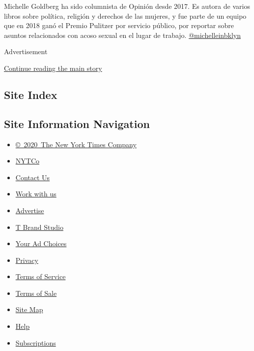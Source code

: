 Michelle Goldberg ha sido columnista de Opinión desde 2017. Es autora de
varios libros sobre política, religión y derechos de las mujeres, y fue
parte de un equipo que en 2018 ganó el Premio Pulitzer por servicio
público, por reportar sobre asuntos relacionados con acoso sexual en el
lugar de trabajo.
\href{https://twitter.com/michelleinbklyn}{@michelleinbklyn}

Advertisement

\protect\hyperlink{after-bottom}{Continue reading the main story}

\hypertarget{site-index}{%
\subsection{Site Index}\label{site-index}}

\hypertarget{site-information-navigation}{%
\subsection{Site Information
Navigation}\label{site-information-navigation}}

\begin{itemize}
\tightlist
\item
  \href{https://help.nytimes3xbfgragh.onion/hc/en-us/articles/115014792127-Copyright-notice}{©~2020~The
  New York Times Company}
\end{itemize}

\begin{itemize}
\tightlist
\item
  \href{https://www.nytco.com/}{NYTCo}
\item
  \href{https://help.nytimes3xbfgragh.onion/hc/en-us/articles/115015385887-Contact-Us}{Contact
  Us}
\item
  \href{https://www.nytco.com/careers/}{Work with us}
\item
  \href{https://nytmediakit.com/}{Advertise}
\item
  \href{http://www.tbrandstudio.com/}{T Brand Studio}
\item
  \href{https://www.nytimes3xbfgragh.onion/privacy/cookie-policy\#how-do-i-manage-trackers}{Your
  Ad Choices}
\item
  \href{https://www.nytimes3xbfgragh.onion/privacy}{Privacy}
\item
  \href{https://help.nytimes3xbfgragh.onion/hc/en-us/articles/115014893428-Terms-of-service}{Terms
  of Service}
\item
  \href{https://help.nytimes3xbfgragh.onion/hc/en-us/articles/115014893968-Terms-of-sale}{Terms
  of Sale}
\item
  \href{https://spiderbites.nytimes3xbfgragh.onion}{Site Map}
\item
  \href{https://help.nytimes3xbfgragh.onion/hc/en-us}{Help}
\item
  \href{https://www.nytimes3xbfgragh.onion/subscription?campaignId=37WXW}{Subscriptions}
\end{itemize}
